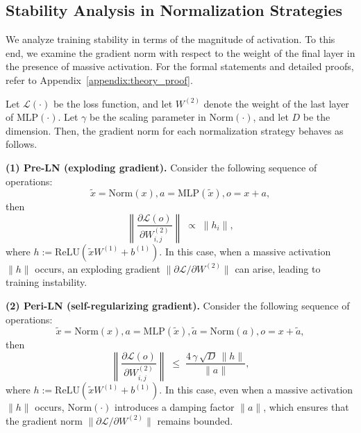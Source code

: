 \subsection{Stability Analysis in Normalization Strategies}
\label{subsec:theory_insights}
We analyze training stability in terms of the magnitude of activation. To this end, we examine the gradient norm with respect to the weight of the final layer in the presence of massive activation. For the formal statements and detailed proofs, refer to Appendix~\ref{appendix:theory_proof}.

\begin{proposition}[Informal]
\label{prop:theory}
Let $\mathcal{L}(\cdot)$ be the loss function, and let $W^{(2)}$ denote the weight of the last layer of $\mathrm{MLP}(\cdot)$. Let $\gamma$ be the scaling parameter in $\mathrm{Norm}(\cdot)$, and let $D$ be the dimension. Then, the gradient norm for each normalization strategy behaves as follows.

\medskip
\noindent 
\textbf{(1) Pre-LN (exploding gradient).} Consider the following sequence of operations:
\begin{equation}
\tilde{x} = \mathrm{Norm}(x), a = \mathrm{MLP}(\tilde{x}), o = x + a,
\end{equation}
then
\begin{equation}
\left\lVert \frac{\partial \mathcal{L}(o)}{\partial W_{i,j}^{(2)}} \right\rVert \;\propto\; \| h_{i} \|,
\end{equation}
where $h := \mathrm{ReLU}\left(\tilde{x} W^{(1)} + b^{(1)}\right)$. In this case, when a massive activation $\|h\|$ occurs, an exploding gradient $\|\partial \mathcal{L} / \partial W^{(2)}\|$ can arise, leading to training instability.

\medskip
\noindent
\textbf{(2) Peri-LN (self-regularizing gradient).} Consider the following sequence of operations:
\begin{equation}
\tilde{x} = \mathrm{Norm}(x), a = \mathrm{MLP}(\tilde{x}), \tilde{a} = \mathrm{Norm}(a), o = x + \tilde{a},
\end{equation}
then
\begin{equation}
\left\lVert \frac{\partial \mathcal{L}(o)}{\partial W_{i,j}^{(2)}} \right\rVert 
\;\le\; \frac{4\,\gamma\,\sqrt{D}\,\|h\|}{\|a\|}, 
\end{equation}
where $h := \mathrm{ReLU}\left(\tilde{x} W^{(1)} + b^{(1)}\right)$. In this case, even when a massive activation $\|h\|$ occurs, $\mathrm{Norm}(\cdot)$ introduces a damping factor $\|a\|$, which ensures that the gradient norm $\|\partial \mathcal{L} / \partial W^{(2)}\|$ remains bounded.


\end{proposition}
